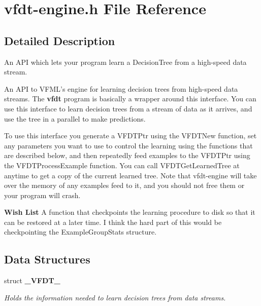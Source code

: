 \section{vfdt-engine.h File Reference}
\label{vfdt-engine_8h}


\subsection{Detailed Description}
An API which lets your program learn a Decision\-Tree from a high-speed data stream. 

An API to VFML's engine for learning decision trees from high-speed data streams. The {\bf vfdt} program is basically a wrapper around this interface. You can use this interface to learn decision trees from a stream of data as it arrives, and use the tree in a parallel to make predictions.

To use this interface you generate a VFDTPtr using the VFDTNew function, set any parameters you want to use to control the learning using the functions that are described below, and then repeatedly feed examples to the VFDTPtr using the VFDTProcess\-Example function. You can call VFDTGet\-Learned\-Tree at anytime to get a copy of the current learned tree. Note that vfdt-engine will take over the memory of any examples feed to it, and you should not free them or your program will crash.

\begin{Desc}
\item[{\bf Wish List}]A function that checkpoints the learning procedure to disk so that it can be restored at a later time. I think the hard part of this would be checkpointing the Example\-Group\-Stats structure. \end{Desc}


\subsection*{Data Structures}
\begin{CompactItemize}
\item 
struct {\bf \_\-VFDT\_\-}
\begin{CompactList}\small\item\em Holds the information needed to learn decision trees from data streams. \item\end{CompactList}\end{CompactItemize}
